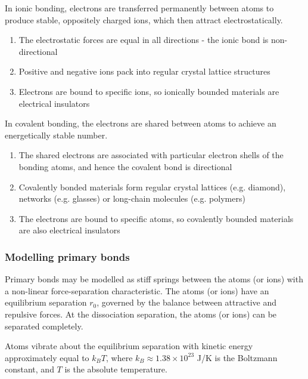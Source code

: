 \documentclass{article}
\begin{document}
\begin{definition}
    In ionic bonding, electrons are transferred permanently between atoms to produce stable, oppositely charged ions, which then attract electrostatically.

    \begin{enumerate}
        \item The electrostatic forces are equal in all directions - the ionic bond is non-directional
        \item Positive and negative ions pack into regular crystal lattice structures
        \item Electrons are bound to specific ions, so ionically bounded materials are electrical insulators
    \end{enumerate}
\end{definition}

\begin{definition}
    In covalent bonding, the electrons are shared between atoms to achieve an energetically stable number.

    \begin{enumerate}
        \item The shared electrons are associated with particular electron shells of the bonding atoms, and hence the covalent bond is directional
        \item Covalently bonded materials form regular crystal lattices (e.g. diamond), networks (e.g. glasses) or long-chain molecules (e.g. polymers)
        \item The electrons are bound to specific atoms, so covalently bounded materials are also electrical insulators
    \end{enumerate}
\end{definition}

\subsubsection{Modelling primary bonds}

Primary bonds may be modelled as stiff springs between the atoms (or ions) with a non-linear force-separation characteristic. The atoms (or ions) have an equilibrium separation $r_0$, governed by the balance between attractive and repulsive forces. At the dissociation separation, the atoms (or ions) can be separated completely. 

Atoms vibrate about the equilibrium separation with kinetic energy approximately equal to $k_BT$, where $k_B \approx 1.38 \times 10^{23}$ J/K is the Boltzmann constant, and $T$ is the absolute temperature. 
\end{document}
